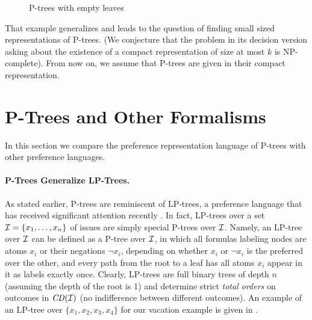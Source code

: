 \begin{figure}[!ht]
\begin{subfigure}[b]{0.2\textwidth}
	\end{subfigure}
  \caption{P-trees with empty leaves}
  \label{fig:PTree_EL}
\end{figure}

That example generalizes and leads to the question
of finding small sized representations of P-trees.
(We conjecture that the
problem in its decision version asking about the existence of a compact 
representation of size at most $k$ is NP-complete). 
From now on, we assume that P-trees are given in their compact representation. 


\section{P-Trees and Other Formalisms}

In this section we compare the preference representation language of P-trees
with other preference languages.


\paragraph{\bf P-Trees Generalize LP-Trees.}

As stated earlier, P-trees are reminiscent of LP-trees, a preference 
language that has received significant attention recently 
\cite{booth:learningLP,lang:aggLP,LiuT}. In fact, LP-trees over a set
$\mathcal{I}=\{x_1,\ldots,x_n\}$ of issues are simply special P-trees over $\mathcal{I}$.
Namely, an LP-tree over $\mathcal{I}$ can be defined as a P-tree over $\mathcal{I}$, in
which all formulas labeling nodes are atoms $x_i$ or their negations $\neg x_i$,
depending on whether $x_i$ or $\neg x_i$ is the preferred over the other, and every path from 
the root to a leaf has all atoms $x_i$ appear in it as labels exactly 
once. Clearly, LP-trees are full binary trees of depth $n$ (assuming the depth of the root is 1) 
and determine strict \emph{total orders} on outcomes 
in $\mathit{CD}(\mathcal{I})$ (no indifference between different outcomes). An example 
of an LP-tree over $\{x_1,x_2,x_3,x_4\}$ for our vacation example is 
given in . 

